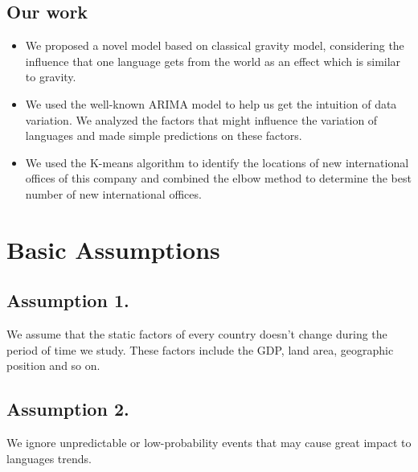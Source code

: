 \documentclass{mcmthesis}
\begin{document}
   \subsection{Our work}
    \begin{itemize}
      \item We proposed a novel model based on classical gravity model, considering the influence that one language gets from the world as an effect which is similar to gravity.
      \item We used the well-known ARIMA model to help us get the intuition of data variation. We analyzed the factors that might influence the variation of languages and made simple predictions on these factors.
      \item We used the K-means algorithm to identify the locations of new international offices of this company and combined the elbow method to determine the best number of new international offices.
    \end{itemize}
  
  
  
  \section{Basic Assumptions}
  \subsection{Assumption 1.}
  
    \indent \indent We assume that the static factors of every country doesn't change during the period of time we study. These factors include the GDP, land area, geographic position and so on.
  
  
  \subsection{Assumption 2.}
  
    \indent \indent We ignore unpredictable or low-probability events that may cause great impact to languages trends.
    
\end{document}
